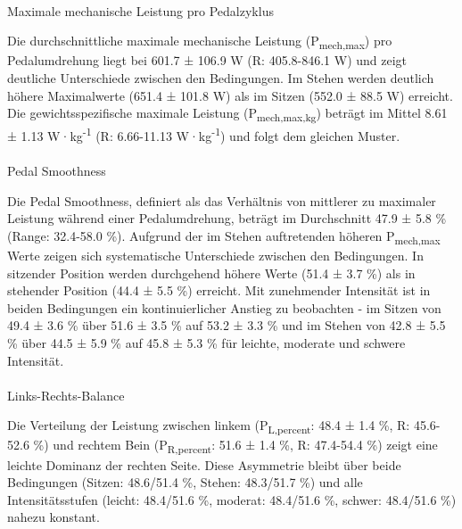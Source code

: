 \documentclass[
  letterpaper,
  DIV=11]{scrartcl}
\makeatletter
\let\oldparagraph\paragraph
\renewcommand{\paragraph}{
    \@ifstar
      \xxxParagraphStar
      \xxxParagraphNoStar
  }
\newcommand{\xxxParagraphStar}[1]{\oldparagraph*{#1}\mbox{}}
\newcommand{\xxxParagraphNoStar}[1]{\oldparagraph{#1}\mbox{}}
\makeatother
\begin{document}
\paragraph{Maximale mechanische Leistung pro
Pedalzyklus}\label{maximale-mechanische-leistung-pro-pedalzyklus}

Die durchschnittliche maximale mechanische Leistung
(P\textsubscript{mech,max}) pro Pedalumdrehung liegt bei 601.7 ± 106.9 W
(R: 405.8-846.1 W) und zeigt deutliche Unterschiede zwischen den
Bedingungen. Im Stehen werden deutlich höhere Maximalwerte (651.4 ±
101.8 W) als im Sitzen (552.0 ± 88.5 W) erreicht. Die
gewichtsspezifische maximale Leistung (P\textsubscript{mech,max,kg})
beträgt im Mittel 8.61 ± 1.13 W·kg\textsuperscript{-1} (R: 6.66-11.13
W·kg\textsuperscript{-1}) und folgt dem gleichen Muster.

\paragraph{Pedal Smoothness}\label{pedal-smoothness}

Die Pedal Smoothness, definiert als das Verhältnis von mittlerer zu
maximaler Leistung während einer Pedalumdrehung, beträgt im Durchschnitt
47.9 ± 5.8 \% (Range: 32.4-58.0 \%). Aufgrund der im Stehen auftretenden
höheren P\textsubscript{mech,max} Werte zeigen sich systematische
Unterschiede zwischen den Bedingungen. In sitzender Position werden
durchgehend höhere Werte (51.4 ± 3.7 \%) als in stehender Position (44.4
± 5.5 \%) erreicht. Mit zunehmender Intensität ist in beiden Bedingungen
ein kontinuierlicher Anstieg zu beobachten - im Sitzen von 49.4 ± 3.6 \%
über 51.6 ± 3.5 \% auf 53.2 ± 3.3 \% und im Stehen von 42.8 ± 5.5 \%
über 44.5 ± 5.9 \% auf 45.8 ± 5.3 \% für leichte, moderate und schwere
Intensität.

\paragraph{Links-Rechts-Balance}\label{links-rechts-balance}

Die Verteilung der Leistung zwischen linkem (P\textsubscript{L,percent}:
48.4 ± 1.4 \%, R: 45.6-52.6 \%) und rechtem Bein
(P\textsubscript{R,percent}: 51.6 ± 1.4 \%, R: 47.4-54.4 \%) zeigt eine
leichte Dominanz der rechten Seite. Diese Asymmetrie bleibt über beide
Bedingungen (Sitzen: 48.6/51.4 \%, Stehen: 48.3/51.7 \%) und alle
Intensitätsstufen (leicht: 48.4/51.6 \%, moderat: 48.4/51.6 \%, schwer:
48.4/51.6 \%) nahezu konstant.
\end{document}
